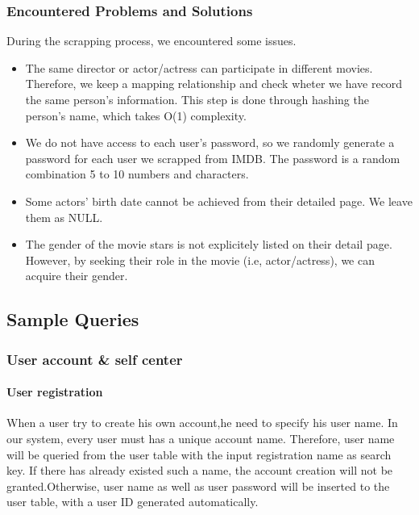\begin{CJK*}{UTF8}{gbsn}
\subsubsection{Encountered Problems and Solutions}
During the scrapping process, we encountered some issues.
\begin{itemize}
    \item The same director or actor/actress can participate in different movies. Therefore, we keep a mapping relationship and check wheter we have record the same person's information. This step is done through hashing the person's name, which takes O(1) complexity.
    \item We do not have access to each user's password, so we randomly generate a password for each user we scrapped from IMDB. The password is a random combination 5 to 10 numbers and characters.
    \item Some actors' birth date cannot be achieved from their detailed page. We leave them as NULL.
    \item The gender of the movie stars is not explicitely listed on their detail page. However, by seeking their role in the movie (i.e, actor/actress), we can acquire their gender.
\end{itemize}
\subsection{Sample Queries}
\subsubsection{User account \& self center}
\paragraph{User registration}
When a user try to create his own account,he need to specify his user name. In our system, every user must has a unique account name. Therefore, user name will be queried from the user table with the input registration name as search key. If there has already existed such a name, the account creation will not be granted.Otherwise, user name as well as user password will be inserted to the user table, with a user ID generated automatically.




\end{CJK*}
